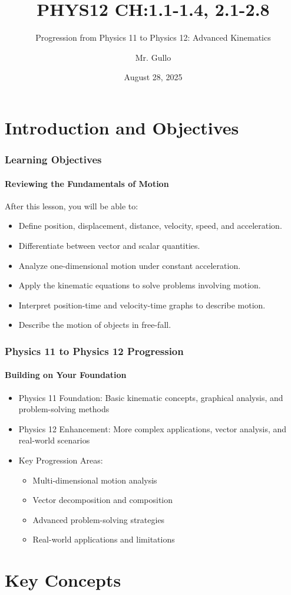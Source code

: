 \documentclass{beamer}
\title[1D Kinematics Review]{PHYS12 CH:1.1-1.4, 2.1-2.8}
\subtitle{Progression from Physics 11 to Physics 12: Advanced Kinematics}
\author[Mr. Gullo]{Mr. Gullo}
\date[Aug 28, 2025]{August 28, 2025}
\begin{document}
\frame{\titlepage}

\section{Introduction and Objectives}

\begin{frame}
\frametitle{Learning Objectives}
\framesubtitle{Reviewing the Fundamentals of Motion}
After this lesson, you will be able to:
\begin{itemize}
    \item Define position, displacement, distance, velocity, speed, and acceleration.
    \item Differentiate between vector and scalar quantities.
    \item Analyze one-dimensional motion under constant acceleration.
    \item Apply the kinematic equations to solve problems involving motion.
    \item Interpret position-time and velocity-time graphs to describe motion.
    \item Describe the motion of objects in free-fall.
\end{itemize}
\end{frame}

\begin{frame}
\frametitle{Physics 11 to Physics 12 Progression}
\framesubtitle{Building on Your Foundation}
\begin{itemize}
    \item \alert{Physics 11 Foundation}: Basic kinematic concepts, graphical analysis, and problem-solving methods
    \pause
    \item \alert{Physics 12 Enhancement}: More complex applications, vector analysis, and real-world scenarios
    \pause
    \item \alert{Key Progression Areas}:
    \begin{itemize}
        \item Multi-dimensional motion analysis
        \item Vector decomposition and composition
        \item Advanced problem-solving strategies
        \item Real-world applications and limitations
    \end{itemize}
\end{itemize}
\end{frame}

\section{Key Concepts}
\end{document}
